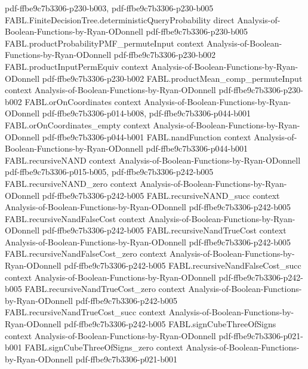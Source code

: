 \begin{theorem}
  {pdf-ffbe9c7b3306-p230-b003,
    pdf-ffbe9c7b3306-p230-b005}
\proofstep
  {FABL.FiniteDecisionTree.deterministicQueryProbability}
  {direct}
  {Analysis-of-Boolean-Functions-by-Ryan-ODonnell}
  {pdf-ffbe9c7b3306-p230-b005}
\proofstep
  {FABL.productProbabilityPMF_permuteInput}
  {context}
  {Analysis-of-Boolean-Functions-by-Ryan-ODonnell}
  {pdf-ffbe9c7b3306-p230-b002}
\proofstep
  {FABL.productInputPermEquiv}
  {context}
  {Analysis-of-Boolean-Functions-by-Ryan-ODonnell}
  {pdf-ffbe9c7b3306-p230-b002}
\proofstep
  {FABL.productMean_comp_permuteInput}
  {context}
  {Analysis-of-Boolean-Functions-by-Ryan-ODonnell}
  {pdf-ffbe9c7b3306-p230-b002}
\proofstep
  {FABL.orOnCoordinates}
  {context}
  {Analysis-of-Boolean-Functions-by-Ryan-ODonnell}
  {pdf-ffbe9c7b3306-p014-b008,
    pdf-ffbe9c7b3306-p044-b001}
\proofstep
  {FABL.orOnCoordinates_empty}
  {context}
  {Analysis-of-Boolean-Functions-by-Ryan-ODonnell}
  {pdf-ffbe9c7b3306-p044-b001}
\proofstep
  {FABL.nandFunction}
  {context}
  {Analysis-of-Boolean-Functions-by-Ryan-ODonnell}
  {pdf-ffbe9c7b3306-p044-b001}
\proofstep
  {FABL.recursiveNAND}
  {context}
  {Analysis-of-Boolean-Functions-by-Ryan-ODonnell}
  {pdf-ffbe9c7b3306-p015-b005,
    pdf-ffbe9c7b3306-p242-b005}
\proofstep
  {FABL.recursiveNAND_zero}
  {context}
  {Analysis-of-Boolean-Functions-by-Ryan-ODonnell}
  {pdf-ffbe9c7b3306-p242-b005}
\proofstep
  {FABL.recursiveNAND_succ}
  {context}
  {Analysis-of-Boolean-Functions-by-Ryan-ODonnell}
  {pdf-ffbe9c7b3306-p242-b005}
\proofstep
  {FABL.recursiveNandFalseCost}
  {context}
  {Analysis-of-Boolean-Functions-by-Ryan-ODonnell}
  {pdf-ffbe9c7b3306-p242-b005}
\proofstep
  {FABL.recursiveNandTrueCost}
  {context}
  {Analysis-of-Boolean-Functions-by-Ryan-ODonnell}
  {pdf-ffbe9c7b3306-p242-b005}
\proofstep
  {FABL.recursiveNandFalseCost_zero}
  {context}
  {Analysis-of-Boolean-Functions-by-Ryan-ODonnell}
  {pdf-ffbe9c7b3306-p242-b005}
\proofstep
  {FABL.recursiveNandFalseCost_succ}
  {context}
  {Analysis-of-Boolean-Functions-by-Ryan-ODonnell}
  {pdf-ffbe9c7b3306-p242-b005}
\proofstep
  {FABL.recursiveNandTrueCost_zero}
  {context}
  {Analysis-of-Boolean-Functions-by-Ryan-ODonnell}
  {pdf-ffbe9c7b3306-p242-b005}
\proofstep
  {FABL.recursiveNandTrueCost_succ}
  {context}
  {Analysis-of-Boolean-Functions-by-Ryan-ODonnell}
  {pdf-ffbe9c7b3306-p242-b005}
\proofstep
  {FABL.signCubeThreeOfSigns}
  {context}
  {Analysis-of-Boolean-Functions-by-Ryan-ODonnell}
  {pdf-ffbe9c7b3306-p021-b001}
\proofstep
  {FABL.signCubeThreeOfSigns_zero}
  {context}
  {Analysis-of-Boolean-Functions-by-Ryan-ODonnell}
  {pdf-ffbe9c7b3306-p021-b001}

\end{theorem}
